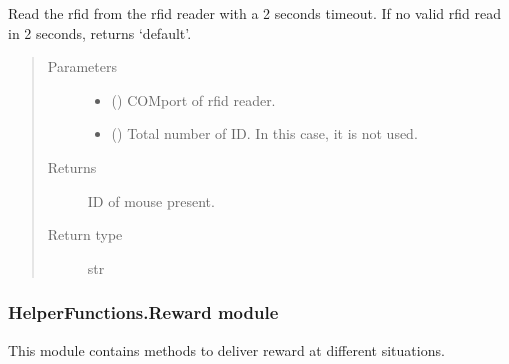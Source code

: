 \documentclass[letterpaper,10pt,english]{sphinxmanual}
\begin{document}
\begin{fulllineitems}
\label{\detokenize{NoSeMazeController/HelperFunctions:HelperFunctions.RFID.check_rfid}}
\pysigstartsignatures
{}
\pysigstopsignatures
\sphinxAtStartPar
Read the rfid from the rfid reader with a 2 seconds timeout.
If no valid rfid read in 2 seconds, returns ‘default’.
\begin{quote}\begin{description}
\item[{Parameters}] \leavevmode\begin{itemize}
\item {} 
\sphinxAtStartPar
{} () \textendash{} COM\sphinxhyphen{}port of rfid reader.

\item {} 
\sphinxAtStartPar
{} () \textendash{} Total number of ID. In this case, it is not used.

\end{itemize}

\item[{Returns}] \leavevmode
\sphinxAtStartPar
{} \textendash{} ID of mouse present.

\item[{Return type}] \leavevmode
\sphinxAtStartPar
str

\end{description}\end{quote}

\end{fulllineitems}


\begin{DUlineblock}{0em}
\item[] 
\end{DUlineblock}


\subsubsection{HelperFunctions.Reward module}
\label{\detokenize{NoSeMazeController/HelperFunctions:module-HelperFunctions.Reward}}\label{\detokenize{NoSeMazeController/HelperFunctions:helperfunctions-reward-module}}
\sphinxAtStartPar
This module contains methods to deliver reward at different situations.
\end{document}
